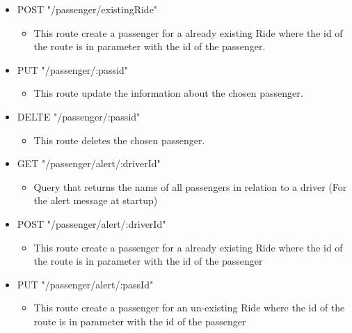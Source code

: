 \begin{itemize}
	\item POST "/passenger/existingRide"
	\begin{itemize}
		\item 	This route create a passenger for a already existing Ride where the id of the route is in parameter with the id of the passenger.
	\end{itemize}
\end{itemize}

\begin{itemize}
	\item PUT "/passenger/:passid"
	\begin{itemize}
		\item This route update the information about the chosen passenger.
	\end{itemize}
\end{itemize}

\begin{itemize}
	\item DELTE "/passenger/:passid"
	\begin{itemize}
		\item This route deletes the chosen passenger.
	\end{itemize}
\end{itemize}

\begin{itemize}
	\item GET "/passenger/alert/:driverId"
	\begin{itemize}
		\item Query that returns the name of all passengers in relation to a driver (For the alert message at startup)
	\end{itemize}
\end{itemize}

\begin{itemize}
	\item POST "/passenger/alert/:driverId"
	\begin{itemize}
		\item This route create a passenger for a already existing Ride where the id of the route is in parameter with the id of the passenger
	\end{itemize}
\end{itemize}

\begin{itemize}
	\item PUT "/passenger/alert/:passId"
	\begin{itemize}
		\item This route create a passenger for an un-existing Ride where the id of the route is in parameter with the id of the passenger
	\end{itemize}
\end{itemize}

